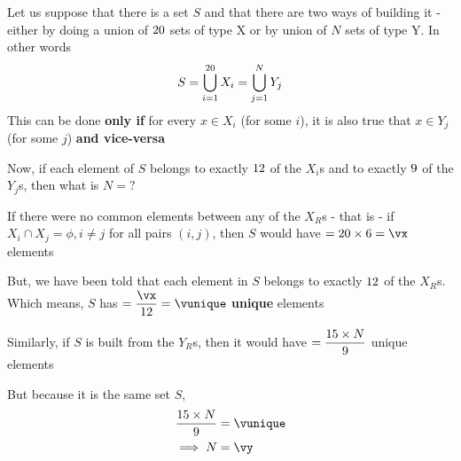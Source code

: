 

\MULTIPLY\va\vc\vx
\DIVIDE\vx\vd\vunique
\MULTIPLY\vunique\ve\a
\DIVIDE\a\vb\vy

\question[5] Let us suppose that there is a set $S$ and that there are two ways of building it - 
either by doing a union of $20$ sets of type X or by union of $N$ sets of type Y.
In other words 
    \[ S = \bigcup_{i=1}^{20} X_i = \bigcup_{j=1}^N Y_j\] 
This can be done \textbf{only if} for every $x\in X_i$ (for some $i$), it is also true that $x\in Y_j$ 
(for some $j$) \textbf{and vice-versa}

Now, if each element of $S$ belongs to exactly $12$ of the $X_i$s and to exactly 
$9$ of the $Y_j$s, then what is $N=?$ 

\watchout[-4cm]

\ifprintanswers
\fi 

\begin{solution}[\fullpage]
  If there were no common elements between any of the $X_R$s - that is - 
  if $X_i\cap X_j = \phi,i\neq j$ for all pairs $(i,j)$, then $S$ would have 
  $=\vc\times\va = \vx$ elements

  But, we have been told that each element in $S$ belongs to exactly $12$ of the $X_R$s.
  Which means, $S$ has $ =\dfrac\vx\vd = \vunique$ \textbf{unique} elements

  Similarly, if $S$ is built from the $Y_R$s, then it would have $=\dfrac{15\times N}{9}$ 
  unique elements 

  But because it is the same set $S$, 
  \begin{align}
    \dfrac{\vb\times N}{\ve} &= \vunique \\
    \implies N &= \vy
  \end{align}
\end{solution}

